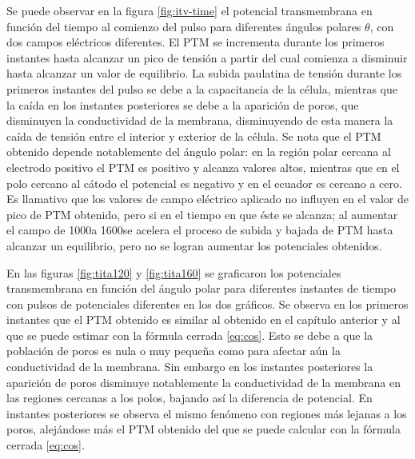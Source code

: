 Se puede observar en la figura \ref{fig:itv-time} el potencial transmembrana en función del tiempo al comienzo del pulso para diferentes ángulos polares $\theta$, con dos campos eléctricos diferentes. El PTM se incrementa durante los primeros instantes hasta alcanzar un pico de tensión a partir del cual comienza a disminuir hasta alcanzar un valor de equilibrio. La subida paulatina de tensión durante los primeros instantes del pulso se debe a la capacitancia de la célula, mientras que la caída en los instantes posteriores se debe a la aparición de poros, que disminuyen la conductividad de la membrana, disminuyendo de esta manera la caída de tensión entre el interior y exterior de la célula. Se nota que el PTM obtenido depende notablemente del ángulo polar: en la región polar cercana al electrodo positivo el PTM es positivo y alcanza valores altos, mientras que en el polo cercano al cátodo el potencial es negativo y en el ecuador es cercano a cero. Es llamativo que los valores de campo eléctrico aplicado no influyen en el valor de pico de PTM obtenido, pero si en el tiempo en que éste se alcanza; al aumentar el campo de 1000\vcm a 1600\vcm se acelera el proceso de subida y bajada de PTM hasta alcanzar un equilibrio, pero no se logran aumentar los potenciales obtenidos.





En las figuras \ref{fig:tita120} y \ref{fig:tita160} se graficaron los potenciales transmembrana en función del ángulo polar para diferentes instantes de tiempo con pulsos de potenciales diferentes en los dos gráficos. Se observa en los primeros instantes que el PTM obtenido es similar al obtenido en el capítulo anterior y al que se puede estimar con la fórmula cerrada \ref{eq:cos}. Esto se debe a que la población de poros es nula o muy pequeña como para afectar aún la conductividad de la membrana. Sin embargo en los instantes posteriores la aparición de poros disminuye notablemente la conductividad de la membrana en las regiones cercanas a los polos, bajando así la diferencia de potencial. En instantes posteriores se observa el mismo fenómeno con regiones más lejanas a los poros, alejándose más el PTM obtenido del que se puede calcular con la fórmula cerrada \ref{eq:cos}.\\


